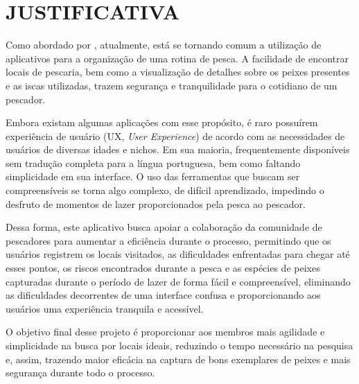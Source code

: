 \chapter{JUSTIFICATIVA}
\label{chap:justificativa}

Como abordado por , atualmente, está se tornando comum a utilização de aplicativos para a organização de uma rotina de pesca. A facilidade de encontrar locais de pescaria, bem como a visualização de detalhes sobre os peixes presentes e as iscas utilizadas, trazem segurança e tranquilidade para o cotidiano de um pescador.

Embora existam algumas aplicações com esse propósito, é raro possuírem experiência de usuário (UX, \textit{User Experience}) de acordo com as necessidades de usuários de diversas idades e nichos. Em sua maioria, frequentemente disponíveis sem tradução completa para a língua portuguesa, bem como faltando simplicidade em sua interface. O uso das ferramentas que buscam ser compreensíveis se torna algo complexo, de difícil aprendizado, impedindo o desfruto de momentos de lazer proporcionados pela pesca ao pescador.

Dessa forma, este aplicativo busca apoiar a colaboração da comunidade de pescadores para aumentar a eficiência durante o processo, permitindo que os usuários registrem os locais visitados, as dificuldades enfrentadas para chegar até esses pontos, os riscos encontrados durante a pesca e as espécies de peixes capturadas durante o período de lazer de forma fácil e compreensível, eliminando as dificuldades decorrentes de uma interface confusa e proporcionando aos usuários uma experiência tranquila e acessível.

O objetivo final desse projeto é proporcionar aos membros mais agilidade e simplicidade na busca por locais ideais, reduzindo o tempo necessário na pesquisa e, assim, trazendo maior eficácia na captura de bons exemplares de peixes e mais segurança durante todo o processo.

